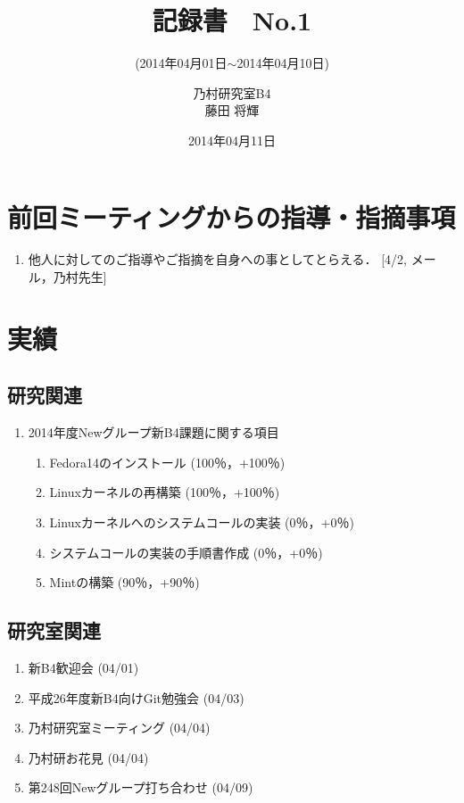 \documentclass[fleqn, 14pt]{extarticle}
\subtitle{(2014年04月01日$\sim$2014年04月10日)}
\author{乃村研究室B4\\藤田 将輝}
\date{2014年04月11日}
\title{記録書　No.1}
\begin{document}
\maketitle
\section{前回ミーティングからの指導・指摘事項}
\label{sec-1}
\begin{enumerate}
\item 他人に対してのご指導やご指摘を自身への事としてとらえる．
\newline
\hfill
[4/2, メール，乃村先生]
\end{enumerate}
\section{実績}
\label{sec-2}
\subsection{研究関連}
\label{sec-2-1}
\begin{enumerate}
\item 2014年度Newグループ新B4課題に関する項目
\hfill
\label{enum-research1}
\begin{enumerate}
\item Fedora14のインストール
\hfill
\label{enum-1-A}
(100％，+100％)
\item Linuxカーネルの再構築
\hfill
\label{enum-1-B}
(100％，+100％)
\item Linuxカーネルへのシステムコールの実装
\hfill
\label{enum-1-C}
(0％，+0％)
\item システムコールの実装の手順書作成
\hfill
\label{enum-1-D}
(0％，+0％)
\item Mintの構築
\hfill
\label{enum-1-E}
(90％，+90％)
\end{enumerate}
\end{enumerate}

\subsection{研究室関連}
\label{sec-2-2}
\begin{enumerate}
\item 新B4歓迎会
\hfill
\label{enum-laboratory1}
(04/01)
\item 平成26年度新B4向けGit勉強会
\hfill
\label{enum-laboratory2}
(04/03)
\item 乃村研究室ミーティング
\hfill
\label{enum-laboratory3}
(04/04)
\item 乃村研お花見
\hfill
\label{enum-laboratory4}
(04/04)
\item 第248回Newグループ打ち合わせ
\hfill
\label{enum-laboratory5}
(04/09)
\end{enumerate}
\end{document}
